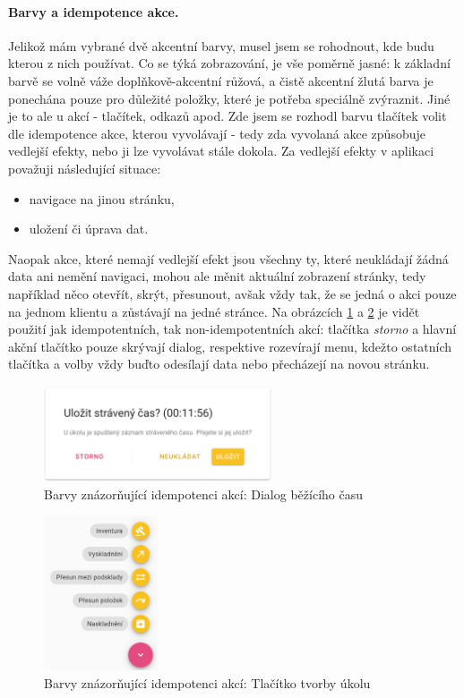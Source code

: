 \paragraph{Barvy a idempotence akce.} Jelikož mám vybrané dvě akcentní barvy, musel jsem se rohodnout, kde budu kterou z nich používat. Co se týká zobrazování, je vše poměrně jasné: k základní barvě se volně váže doplňkově-akcentní růžová, a čistě akcentní žlutá barva je ponechána pouze pro důležité položky, které je potřeba speciálně zvýraznit. Jiné je to ale u akcí - tlačítek, odkazů apod. Zde jsem se rozhodl barvu tlačítek volit dle idempotence akce, kterou vyvolávají - tedy zda vyvolaná akce způsobuje vedlejší efekty, nebo ji lze vyvolávat stále dokola. Za vedlejší efekty v aplikaci považuji následující situace:
\begin{itemize}
    \item navigace na jinou stránku,
    \item uložení či úprava dat.
\end{itemize}
Naopak akce, které nemají vedlejší efekt jsou všechny ty, které neukládají žádná data ani nemění navigaci, mohou ale měnit aktuální zobrazení stránky, tedy například něco otevřít, skrýt, přesunout, avšak vždy tak, že se jedná o akci pouze na jednom klientu a zůstávají na jedné stránce. Na obrázcích \ref{picture:colors:time_tracker} a \ref{picture:colors:task_fab} je vidět použití jak idempotentních, tak non-idempotentních akcí: tlačítka \emph{storno} a hlavní akční tlačítko pouze skrývají dialog, respektive rozevírají menu, kdežto ostatních tlačítka a volby vždy buďto odesílají data nebo přecházejí na novou stránku.

\begin{figure}[]
    \includegraphics[width=0.6\textwidth]{../png/app/colors_time_tracker.png}
    \caption{Barvy znázorňující idempotenci akcí: Dialog běžícího času} \label{picture:colors:time_tracker}
\end{figure}
\begin{figure}[]
    \includegraphics[width=0.3\textwidth]{../png/app/colors_tasks.png}
    \caption{Barvy znázorňující idempotenci akcí: Tlačítko tvorby úkolu} \label{picture:colors:task_fab}
\end{figure}
